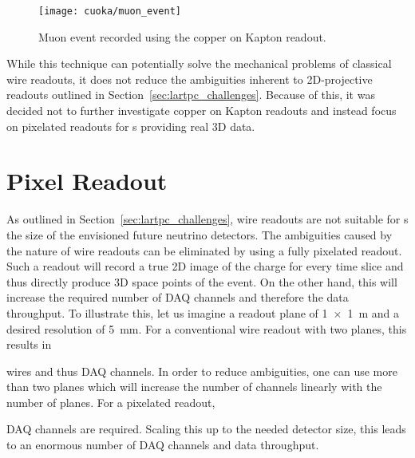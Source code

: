 \begin{figure}[htb]
	\centering
	\texttt{[image: cuoka/muon\_event]}
	\caption{Muon event recorded using the copper on Kapton readout.}
	\label{fig:cuoka_event}
\end{figure}

While this technique can potentially solve the mechanical problems of classical wire readouts, it does not reduce the ambiguities inherent to 2D-projective readouts outlined in Section~\ref{sec:lartpc_challenges}.
Because of this, it was decided not to further investigate copper on Kapton readouts and instead focus on pixelated readouts for \lartpc s providing real 3D data.


\section{Pixel Readout}
\label{sec:charge-ro_pixels}

As outlined in Section~\ref{sec:lartpc_challenges}, wire readouts are not suitable for \lartpc s the size of the envisioned future neutrino detectors.
The ambiguities caused by the nature of wire readouts can be eliminated by using a fully pixelated readout.
Such a readout will record a true 2D image of the charge for every time slice and thus directly produce 3D space points of the event.
On the other hand, this will increase the required number of DAQ channels and therefore the data throughput.
To illustrate this, let us imagine a readout plane of \SI{1 x 1}{\metre} and a desired resolution of \SI{5}{\milli\metre}.
For a conventional wire readout with two planes, this results in


wires and thus DAQ channels.
In order to reduce ambiguities, one can use more than two planes which will increase the number of channels linearly with the number of planes.
For a pixelated readout,


DAQ channels are required.
Scaling this up to the needed detector size, this leads to an enormous number of DAQ channels and data throughput.

